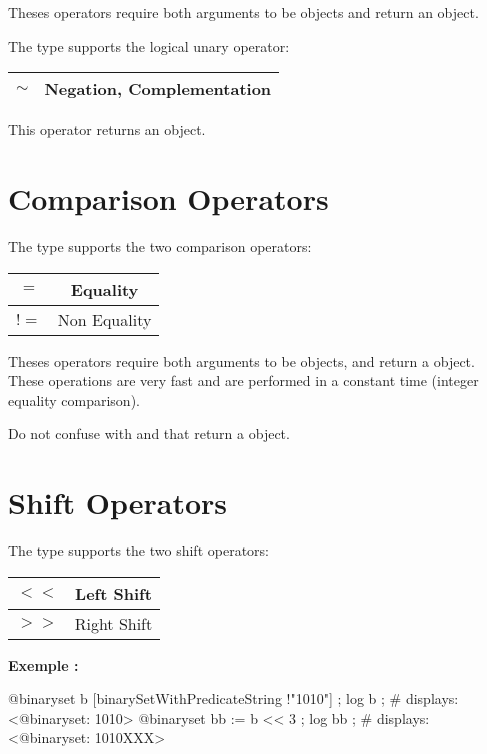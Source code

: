 Theses operators require both arguments to be  objects and return an  object.\newline


The  type supports the logical unary operator:\newline

\begin{tabular}{|c|c|}
\hline
$\sim$ & Negation, Complementation \\
\hline
\end{tabular}

This operator returns an  object.







\section{Comparison Operators}

The  type supports the two comparison operators:\newline

\begin{tabular}{|c|c|}
\hline
$=$ & Equality \\
\hline
$!=$ & Non Equality \\
\hline
\end{tabular}

Theses operators require both arguments to be  objects, and return a  object. These operations are very fast and are performed in a constant time (integer equality comparison).

Do not confuse with  and  that return a  object.







\section{Shift Operators}

The  type supports the two shift operators:\newline

\begin{tabular}{|c|c|}
\hline
$<<$ & Left Shift \\
\hline
$>>$ & Right Shift \\
\hline
\end{tabular}

\textbf{Exemple :}
\begin{galgascode}
@binaryset b [binarySetWithPredicateString !"1010"] ;
log b ; # displays: <@binaryset: 1010>
@binaryset bb := b << 3 ;
log bb ; # displays: <@binaryset: 1010XXX>
\end{galgascode}

